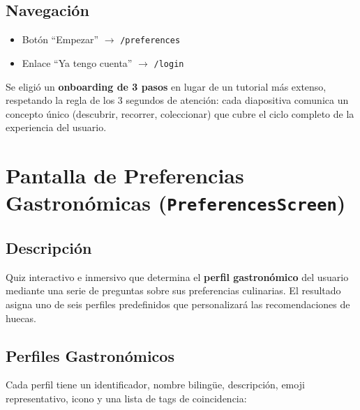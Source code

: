 \documentclass[11pt, a4paper, oneside]{report}
\begin{document}
\subsection{Navegación}
\begin{itemize}
  \item Botón ``Empezar'' $\rightarrow$ \texttt{/preferences}
  \item Enlace ``Ya tengo cuenta'' $\rightarrow$ \texttt{/login}
\end{itemize}

\begin{decisionbox}
  Se eligió un \textbf{onboarding de 3 pasos} en lugar de un tutorial más extenso, respetando la regla de los 3 segundos de atención: cada diapositiva comunica un concepto único (descubrir, recorrer, coleccionar) que cubre el ciclo completo de la experiencia del usuario.
\end{decisionbox}

\section{Pantalla de Preferencias Gastronómicas (\texttt{PreferencesScreen})}

\subsection{Descripción}
Quiz interactivo e inmersivo que determina el \textbf{perfil gastronómico} del usuario mediante una serie de preguntas sobre sus preferencias culinarias. El resultado asigna uno de seis perfiles predefinidos que personalizará las recomendaciones de huecas.

\subsection{Perfiles Gastronómicos}
Cada perfil tiene un identificador, nombre bilingüe, descripción, emoji representativo, icono y una lista de tags de coincidencia:
\end{document}
